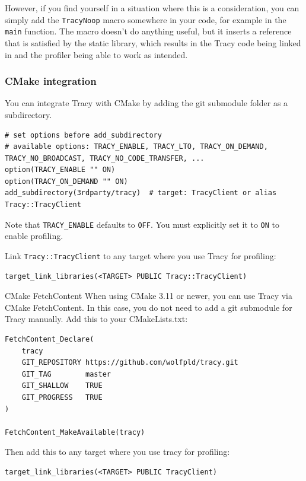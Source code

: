 \documentclass[hidelinks,titlepage,a4paper,twoside]{article}
\begin{document}
However, if you find yourself in a situation where this is a consideration, you can simply add the \texttt{TracyNoop} macro somewhere in your code, for example in the \texttt{main} function. The macro doesn't do anything useful, but it inserts a reference that is satisfied by the static library, which results in the Tracy code being linked in and the profiler being able to work as intended.

\subsubsection{CMake integration}

You can integrate Tracy with CMake by adding the git submodule folder as a subdirectory.

\begin{lstlisting}
# set options before add_subdirectory
# available options: TRACY_ENABLE, TRACY_LTO, TRACY_ON_DEMAND, TRACY_NO_BROADCAST, TRACY_NO_CODE_TRANSFER, ...
option(TRACY_ENABLE "" ON)
option(TRACY_ON_DEMAND "" ON)
add_subdirectory(3rdparty/tracy)  # target: TracyClient or alias Tracy::TracyClient
\end{lstlisting}

Note that \texttt{TRACY\_ENABLE} defaults to \texttt{OFF}. You must explicitly set it to \texttt{ON} to enable profiling.

Link \texttt{Tracy::TracyClient} to any target where you use Tracy for profiling:

\begin{lstlisting}
target_link_libraries(<TARGET> PUBLIC Tracy::TracyClient)
\end{lstlisting}

\begin{bclogo}[
noborder=true,
couleur=black!5,
logo=\bclampe
]{CMake FetchContent}
When using CMake 3.11 or newer, you can use Tracy via CMake FetchContent. In this case, you do not need to add a git submodule for Tracy manually. Add this to your CMakeLists.txt:

\begin{lstlisting}
FetchContent_Declare(
    tracy
    GIT_REPOSITORY https://github.com/wolfpld/tracy.git
    GIT_TAG        master
    GIT_SHALLOW    TRUE
    GIT_PROGRESS   TRUE
)

FetchContent_MakeAvailable(tracy)
\end{lstlisting}

Then add this to any target where you use tracy for profiling:

\begin{lstlisting}
target_link_libraries(<TARGET> PUBLIC TracyClient)
\end{lstlisting}
\end{bclogo}
\end{document}
